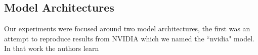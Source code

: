 \documentclass{article}
\begin{document}
\subsection{Model Architectures}

Our experiments were focused around two model architectures, the first was an attempt to reproduce results from NVIDIA \cite{DBLP:journals/corr/BojarskiTDFFGJM16} which we named the ``nvidia" model. In that work the authors learn

\begin{figure}
  \centering
  \hfill
  \hfill
  \par
  \hfill
  \hfill

\end{figure}
\end{document}
